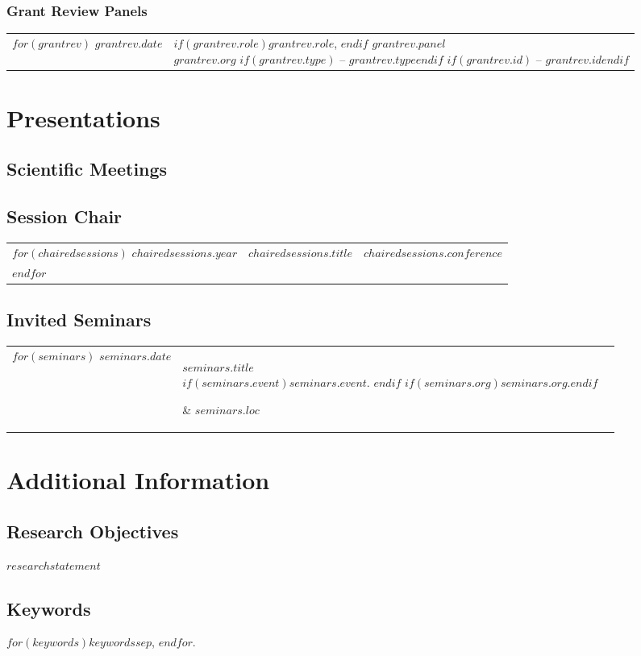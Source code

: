 \documentclass[martgin, line]{article}
\begin{document}
\subsubsection*{Grant Review Panels}
\setlength{\extrarowheight}{.75em}
\begin{tabular}{lp{5.5in}}   
$for(grantrev)$
$grantrev.date$&
\parbox[t]{5.5in}{
  $if(grantrev.role)$$grantrev.role$, $endif$ 
  $grantrev.panel$\\
  \textit{$grantrev.org$}
  $if(grantrev.type)$ -- \textit{$grantrev.type$}$endif$
  $if(grantrev.id)$ -- \textit{$grantrev.id$}$endif$
  }\\
$endfor$
\end{tabular}
\setlength{\extrarowheight}{0em}


\section*{Presentations}
\subsection*{Scientific Meetings}

\begin{enumerate}
  
\end{enumerate}

\subsection*{Session Chair}

\setlength{\extrarowheight}{.25em}
\begin{longtable}[l]{lll}
  $for(chairedsessions)$
  $chairedsessions.year$&
  $chairedsessions.title$&
  $chairedsessions.conference$\\
  $endfor$
\end{longtable}
\setlength{\extrarowheight}{0em}

\subsection*{Invited Seminars}

\setlength{\extrarowheight}{.75em}
\begin{longtable}[l]{lp{3.75in}l}
  $for(seminars)$
  $seminars.date$&
  \parbox[t]{3.75in} { $seminars.title$\\
    \scriptsize{%
      $if(seminars.event)$\textit{$seminars.event$}. $endif$%
      $if(seminars.org)$$seminars.org$.$endif$%
    }} & $seminars.loc$\\
  $endfor$
\end{longtable}
\setlength{\extrarowheight}{0em}

\section*{Additional Information}

\subsection*{Research Objectives}

$researchstatement$

\subsection*{Keywords}

$for(keywords)$$keywords$$sep$, $endfor$.
\end{document}
